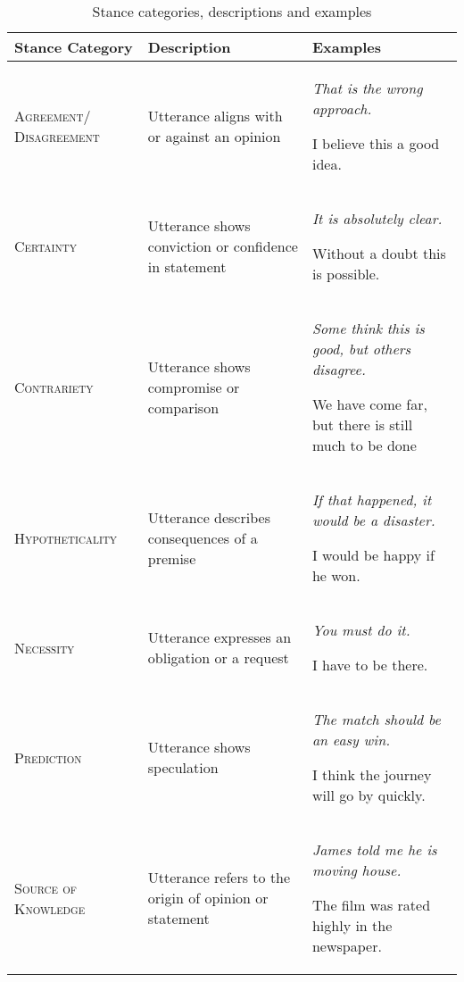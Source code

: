\documentclass[Dissertation.tex]{subfiles}
\begin{document}
{\renewcommand{\arraystretch}{2.5}
	\centering
	\begin{table}[]
		\caption{Stance categories, descriptions and examples}
		\label{tab:stanceExamples}
		
		\begin{tabularx}{\textwidth}{>{\raggedright}p{3cm} >{\raggedright}p{5.5cm} X}
			\toprule
			Stance Category        & Description                                            & Examples                                                                                                                                      \\ \midrule
			\small\scshape Agreement/ Disagreement &Utterance aligns with or against an opinion &\itshape That is the wrong approach. \par I believe this a good idea.\\
			\small\scshape Certainty              &Utterance shows conviction or confidence in statement& \itshape It is absolutely clear. \par Without a doubt this is possible.                                          \\
			\small\scshape Contrariety            & Utterance shows compromise or comparison               & \itshape Some think this is good, but others disagree.\par We have come far,  but there is still much to be done\\ 
			\small\scshape Hypotheticality        & Utterance describes consequences of a premise          &\itshape If that happened, it would be a disaster.\par I would be happy if he won.                              \\
			\small\scshape Necessity              & Utterance expresses an obligation or a request         & \itshape You must do it.\par I have to be there.                                                                \\
			\small\scshape Prediction             & Utterance shows speculation                            &\itshape The match should be an easy win.\par I think the journey will go by quickly.                           \\
			\small\scshape Source of Knowledge    & Utterance refers to the origin of opinion or statement & \itshape James told me he is moving house.\par The film was rated highly in the newspaper.                      \\

\end{tabularx}
\end{table}}
\end{document}
